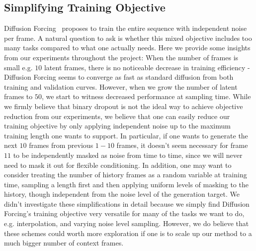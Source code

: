 \subsection{Simplifying Training Objective}
\label{app:method_details_objective_causal}
Diffusion Forcing~\cite{chen2024diffusion} proposes to train the entire sequence with independent noise per frame. A natural question to ask is whether this mixed objective includes too many tasks compared to what one actually needs. Here we provide some insights from our experiments throughout the project: When the number of frames is small e.g. $10$ latent frames, there is no noticeable decrease in training efficiency - Diffusion Forcing seems to converge as fast as standard diffusion from both training and validation curves. However, when we grow the number of latent frames to $50$, we start to witness decreased performance at sampling time. While we firmly believe that binary dropout is not the ideal way to achieve objective reduction from our experiments, we believe that one can easily reduce our training objective by only applying independent noise up to the maximum training length one wants to support. In particular, if one wants to generate the next $10$ frames from previous $1-10$ frames, it doesn't seem necessary for frame $11$ to be independently masked as noise from time to time, since we will never need to mask it out for flexible conditioning. In addition, one may want to consider treating the number of history frames as a random variable at training time, sampling a length first and then applying uniform levels of masking to the history, though independent from the noise level of the generation target. We didn't investigate these simplifications in detail because we simply find Diffusion Forcing's training objective very versatile for many of the tasks we want to do, e.g. interpolation, and varying noise level sampling. However, we do believe that these schemes could worth more exploration if one is to scale up our method to a much bigger number of context frames.


